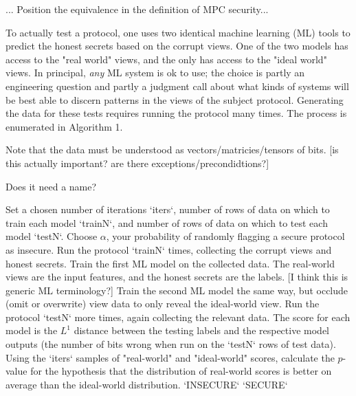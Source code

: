 \documentclass[conference]{IEEEtran}
\begin{document}
... Position the equivalence in the definition of MPC security...

To actually test a protocol, one uses two identical machine learning (ML) tools to predict the honest secrets based on the corrupt views.
One of the two models has access to the "real world" views, and the only has access to the "ideal world" views.
In principal, \textit{any} ML system is ok to use; the choice is partly an engineering question
and partly a judgment call about what kinds of systems will be best able to discern patterns in the views of the subject protocol.
Generating the data for these tests requires running the protocol many times.
The process is enumerated in Algorithm 1.

Note that the data must be understood as vectors/matricies/tensors of bits. [is this actually important? are there exceptions/precondidtions?]

\begin{algorithm}  %
  \caption{Does it need a name?}
  \begin{algorithmic}[1]
  \STATE Set a chosen number of iterations `iters`,
         number of rows of data on which to train each model `trainN`,
         and number of rows of data on which to test each model `testN`.
  \STATE Choose $\alpha$, your probability of randomly flagging a secure protocol as insecure.
    \STATE Run the protocol `trainN` times, collecting the corrupt views and honest secrets.
    \STATE Train the first ML model on the collected data.
           The real-world views are the input features, and the honest secrets are the labels. [I think this is generic ML terminology?]
    \STATE Train the second ML model the same way, but occlude (omit or overwrite) view data to only reveal the ideal-world view.
    \STATE Run the protocol `testN` more times, again collecting the relevant data.
    \STATE The score for each model is the $L^1$ distance between the testing labels and the respective model outputs
           (\ie the number of bits wrong when run on the `testN` rows of test data).
  \ENDFOR
  \STATE Using the `iters` samples of "real-world" and "ideal-world" scores,
         calculate the $p$-value for the hypothesis that the distribution of real-world scores is better on average than the ideal-world distribution.
   \RETURN `INSECURE` \ELSE \RETURN `SECURE` \ENDIF
  \end{algorithmic}
\end{algorithm}
\end{document}
